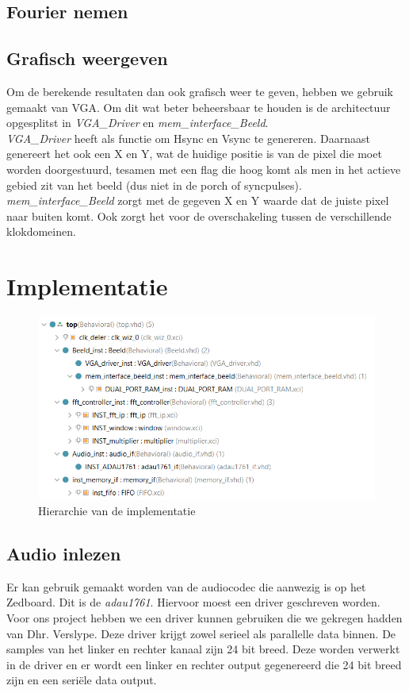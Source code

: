\documentclass[a4paper,kul]{kulakarticle} %
\begin{document}
\subsection{Fourier nemen}

\subsection{Grafisch weergeven}
Om de berekende resultaten dan ook grafisch weer te geven, hebben we gebruik gemaakt van VGA. Om dit wat beter beheersbaar te houden is de architectuur opgesplitst in \textit{VGA\_Driver} en \textit{mem\_interface\_Beeld}.\\
\textit{VGA\_Driver} heeft als functie om Hsync en Vsync te genereren. Daarnaast genereert het ook een X en Y, wat de huidige positie is van de pixel die moet worden doorgestuurd, tesamen met een flag die hoog komt als men in het actieve gebied zit van het beeld (dus niet in de porch of syncpulses).\\
\textit{mem\_interface\_Beeld} zorgt met de gegeven X en Y waarde dat de juiste pixel naar buiten komt. Ook zorgt het voor de overschakeling tussen de verschillende klokdomeinen.

\section{Implementatie}


\begin{figure}[H]
	\centering
	\includegraphics[width=0.7\linewidth]{HierarchieVivado.png}
	\caption{Hierarchie van de implementatie}
	\label{fig:hierarchieVivado}
\end{figure}

\subsection{Audio inlezen}

Er kan gebruik gemaakt worden van de audiocodec die aanwezig is op het Zedboard. Dit is de \textit{adau1761}. Hiervoor moest een driver geschreven worden. Voor ons project hebben we een driver kunnen gebruiken die we gekregen hadden van Dhr. Verslype. Deze driver krijgt zowel serieel als parallelle data binnen. De samples van het linker en rechter kanaal zijn 24 bit breed. Deze worden verwerkt in de driver en er wordt een linker en rechter output gegenereerd die 24 bit breed zijn en een seriële data output. \newline
\end{document}
